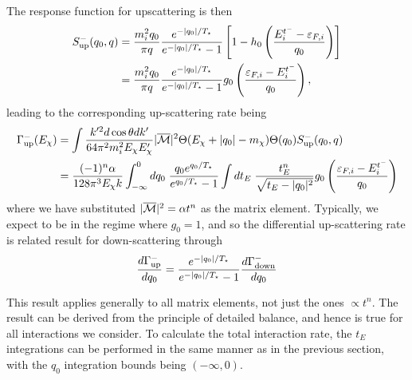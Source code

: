 The response function for upscattering is then
\begin{align}
    S^-_\mathrm{up}(q_0, q) &= \frac{m_i^2 q_0}{\pi q} \frac{ e^{-|q_0|/T_\star}}{e^{-|q_0|/T_\star} -1} \left[ 1 - h_0\left( \frac{E_i^{t^-}-\varepsilon_{F,i}}{q_0}\right)\right]\\
    & = \frac{m_i^2 q_0}{\pi q} \frac{ e^{-|q_0|/T_\star}}{e^{-|q_0|/T_\star} -1}g_0\left( \frac{\varepsilon_{F,i} - E_i^{t^-}}{q_0}\right),
\end{align}
leading to the corresponding up-scattering rate being
\begin{align}
    \Gamma_\mathrm{up}^-(E_\chi) &= \int \frac{k'^{2}d\cos\theta dk'}{64\pi^2m_i^2 E_\chi E'_\chi }|\overline{\mathcal M}|^2\Theta(E_\chi+|q_0|-m_\chi) \Theta(q_0)S_\mathrm{up}^-(q_0, q)\\
    & = \frac{ (-1)^n \alpha}{128\pi^3 E_\chi k}\int_{-\infty}^{0}dq_0\;\frac{q_0 e^{q_0/T_\star}}{e^{q_0/T_\star} -1}\int dt_E \; \frac{t_E^n}{\sqrt{t_E -|q_0|^2}} g_0\left( \frac{\varepsilon_{F,i} - E_i^{t^-}}{q_0}\right)
\end{align}
where we have substituted $|\overline{\mathcal M}|^2 = \alpha t^n$ as the matrix element. Typically, we expect to be in the regime where $g_0 = 1$, and so the differential up-scattering rate is related result for down-scattering through
\begin{equation}
    \frac{d\Gamma_\mathrm{up}^-}{dq_0} = \frac{e^{-|q_0|/T_\star}}{e^{-|q_0|/T_\star} - 1} \frac{d\Gamma_\mathrm{down}^-}{dq_0} 
\end{equation}

This result applies generally to all matrix elements, not just the ones $\propto t^n$. The result can be derived from the principle of detailed balance, and hence is true for all interactions we consider. To calculate the total interaction rate, the $t_E$ integrations can be performed in the same manner as in the previous section, with the $q_0$ integration bounds being $(-\infty, 0)$.

    
